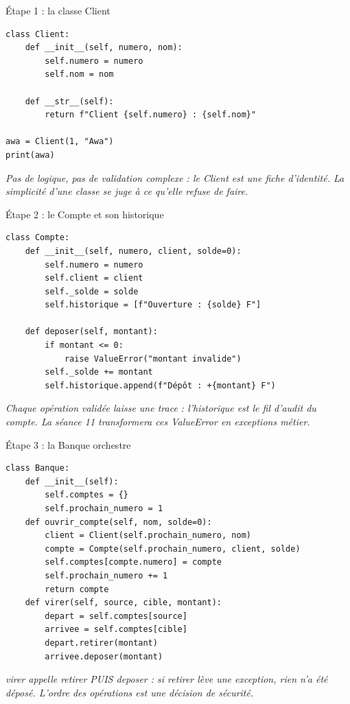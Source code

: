 \documentclass[aspectratio=169,11pt]{beamer}
\begin{document}
\begin{frame}[fragile]{Étape 1 : la classe Client}

\begin{lstlisting}[style=py]
class Client:
    def __init__(self, numero, nom):
        self.numero = numero
        self.nom = nom

    def __str__(self):
        return f"Client {self.numero} : {self.nom}"

awa = Client(1, "Awa")
print(awa)
\end{lstlisting}
\vspace{0.5pt}

{\small\color{PyGris}\itshape Pas de logique, pas de validation complexe : le Client est une fiche d'identité. La simplicité d'une classe se juge à ce qu'elle refuse de faire.}

\end{frame}

\begin{frame}[fragile]{Étape 2 : le Compte et son historique}

\begin{lstlisting}[style=py]
class Compte:
    def __init__(self, numero, client, solde=0):
        self.numero = numero
        self.client = client
        self._solde = solde
        self.historique = [f"Ouverture : {solde} F"]

    def deposer(self, montant):
        if montant <= 0:
            raise ValueError("montant invalide")
        self._solde += montant
        self.historique.append(f"Dépôt : +{montant} F")
\end{lstlisting}
\vspace{0.5pt}

{\small\color{PyGris}\itshape Chaque opération validée laisse une trace : l'historique est le fil d'audit du compte. La séance 11 transformera ces ValueError en exceptions métier.}

\end{frame}

\begin{frame}[fragile]{Étape 3 : la Banque orchestre}

\begin{lstlisting}[style=py]
class Banque:
    def __init__(self):
        self.comptes = {}
        self.prochain_numero = 1
    def ouvrir_compte(self, nom, solde=0):
        client = Client(self.prochain_numero, nom)
        compte = Compte(self.prochain_numero, client, solde)
        self.comptes[compte.numero] = compte
        self.prochain_numero += 1
        return compte
    def virer(self, source, cible, montant):
        depart = self.comptes[source]
        arrivee = self.comptes[cible]
        depart.retirer(montant)
        arrivee.deposer(montant)
\end{lstlisting}
\vspace{0.5pt}

{\small\color{PyGris}\itshape virer appelle retirer PUIS deposer : si retirer lève une exception, rien n'a été déposé. L'ordre des opérations est une décision de sécurité.}

\end{frame}
\end{document}
